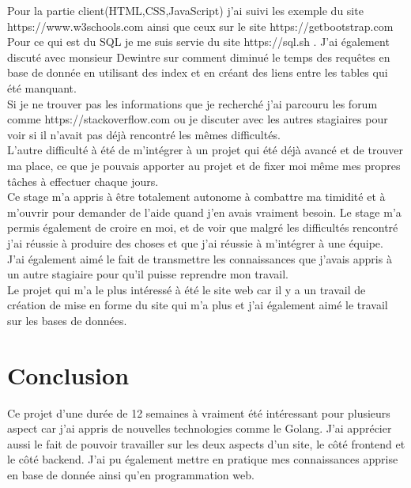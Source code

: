 \documentclass[12pt,a4paper]{report}
\begin{document}
Pour la partie client(HTML,CSS,JavaScript) j'ai suivi les exemple du site https://www.w3schools.com ainsi que ceux sur le site https://getbootstrap.com\\

Pour ce qui est du SQL je me suis servie du site https://sql.sh . J'ai également discuté avec monsieur Dewintre sur comment diminué le temps des requêtes en base de donnée en utilisant des index et en créant des liens entre les tables qui été manquant.\\

Si je ne trouver pas les informations que je recherché j'ai parcouru les forum  comme https://stackoverflow.com ou je discuter avec les autres stagiaires pour voir si il n'avait pas déjà rencontré les mêmes difficultés.\\

L'autre difficulté à été de m'intégrer à un projet qui été déjà avancé et de trouver ma place, ce que je pouvais apporter au projet et de fixer moi même mes propres tâches à effectuer chaque jours.\\

Ce stage m'a appris à être totalement autonome à combattre ma timidité et à m'ouvrir pour demander de l'aide quand j'en avais vraiment besoin. Le stage m'a permis également de croire en moi, et de voir que malgré les difficultés rencontré j'ai réussie à produire des choses et que j'ai réussie à m'intégrer à une équipe.\\

J'ai également aimé le fait de transmettre les connaissances que j'avais appris à un autre stagiaire pour qu'il puisse reprendre mon travail.\\

Le projet qui m'a le plus intéressé à été le site web car il y a un travail de création de mise en forme du site qui m'a plus et j'ai également aimé le travail sur les bases de données.

\chapter[Conclusion]{Conclusion}

Ce projet d'une durée de 12 semaines à vraiment été intéressant pour plusieurs aspect car j'ai appris de nouvelles technologies comme le Golang. J'ai apprécier aussi le fait de pouvoir travailler sur les deux aspects d'un site, le côté frontend et le côté backend. J'ai pu également mettre en pratique mes connaissances apprise en base de donnée ainsi qu'en programmation web.\\
\end{document}
